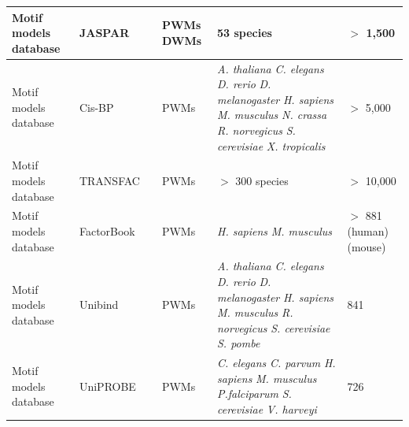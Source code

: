 \documentclass[a4paper, titlepage, openright]{book}
\begin{document}
\begin{table}
\begin{tabular}{|p{2cm}|p{2cm}|p{3cm}|p{2cm}|p{4cm}|p{2cm}|}
		\hline
		Motif models database & JASPAR & \citep{sandelin2004jaspar, fornes2020jaspar} & PWMs \newline DWMs & 53 species & $>$ 1,500 \\
		\hline
		Motif models database & Cis-BP & \citep{weirauch2014determination} & PWMs & \emph{A. thaliana} \newline \emph{C. elegans} \newline \emph{D. rerio}  \newline \emph{D. melanogaster} \newline \emph{H. sapiens} \newline \emph{M. musculus} \newline \emph{N. crassa} \newline \emph{R. norvegicus} \newline \emph{S. cerevisiae} \newline \emph{X. tropicalis} & $>$ 5,000 \\
		\hline
		Motif models database & TRANSFAC & \citep{wingender1996transfac, wingender2000transfac} & PWMs & $>$ 300 species & $>$ 10,000 \\
		\hline
		Motif models database & FactorBook & \citep{pratt2022factorbook} & PWMs & \emph{H. sapiens} \newline \emph{M. musculus}  & $>$ 881 (human) \newline 49 (mouse) \\
		\hline
		Motif models database & Unibind & \citep{puig2021unibind} & PWMs &\emph{A. thaliana} \newline \emph{C. elegans} \newline \emph{D. rerio}  \newline \emph{D. melanogaster} \newline \emph{H. sapiens} \newline \emph{M. musculus} \newline \emph{R. norvegicus} \newline \emph{S. cerevisiae} \newline \emph{S. pombe}  & 841 \\
		\hline
		Motif models database & UniPROBE & \citep{newburger2009uniprobe} & PWMs & \emph{C. elegans} \newline \emph{C. parvum} \newline \emph{H. sapiens} \newline \emph{M. musculus} \newline \emph{P.falciparum} \newline \emph{S. cerevisiae} \newline \emph{V. harveyi}  & 726 \\

\end{tabular}
\end{table}
\end{document}
